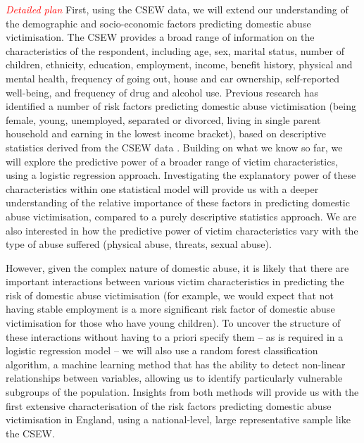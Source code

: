 \documentclass[11pt, a4paper]{article}
\begin{document}
\textcolor{red}{\textit{Detailed plan}} First, using the CSEW data, we will extend our understanding of the demographic and socio-economic factors predicting domestic abuse victimisation. The CSEW provides a broad range of information on the characteristics of the respondent, including age, sex, marital status, number of children, ethnicity, education, employment, income, benefit history, physical and mental health, frequency of going out, house and car ownership, self-reported well-being, and frequency of drug and alcohol use. Previous research has identified a number of risk factors predicting domestic abuse victimisation (being female, young, unemployed, separated or divorced, living in single parent household and earning in the lowest income bracket), based on descriptive statistics derived from the CSEW data \cite{ONS}. Building on what we know so far, we will explore the predictive power of a broader range of victim characteristics, using a logistic regression approach. Investigating the explanatory power of these characteristics within one statistical model will provide us with a deeper understanding of the relative importance of these factors in predicting domestic abuse victimisation, compared to a purely descriptive statistics approach. We are also interested in how the predictive power of victim characteristics vary with the type of abuse suffered (physical abuse, threats, sexual abuse).

 However, given the complex nature of domestic abuse, it is likely that there are important interactions between various victim characteristics in predicting the risk of domestic abuse victimisation (for example, we would expect that not having stable employment is a more significant risk factor of domestic abuse victimisation for those who have young children). To uncover the structure of these interactions without having to a priori specify them -- as is required in a logistic regression model -- we will also use a random forest classification algorithm, a machine learning method that has the ability to detect non-linear relationships between variables, allowing us to identify particularly vulnerable subgroups of the population. Insights from both methods will provide us with the first extensive characterisation of the risk factors predicting domestic abuse victimisation in England, using a national-level, large representative sample like the CSEW.
 
 
\end{document}
